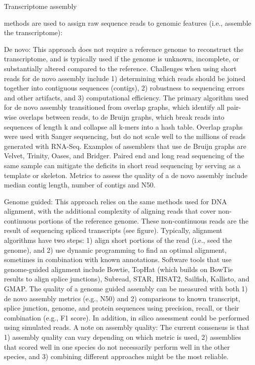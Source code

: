 Transcriptome assembly

methods are used to assign raw sequence reads to genomic features (i.e., assemble the transcriptome):

De novo: This approach does not require a reference genome to reconstruct the transcriptome, and is typically used if the genome is unknown, incomplete, or substantially altered compared to the reference. Challenges when using short reads for de novo assembly include 1) determining which reads should be joined together into contiguous sequences (contigs), 2) robustness to sequencing errors and other artifacts, and 3) computational efficiency. The primary algorithm used for de novo assembly transitioned from overlap graphs, which identify all pair-wise overlaps between reads, to de Bruijn graphs, which break reads into sequences of length k and collapse all k-mers into a hash table. Overlap graphs were used with Sanger sequencing, but do not scale well to the millions of reads generated with RNA-Seq. Examples of assemblers that use de Bruijn graphs are Velvet, Trinity, Oases, and Bridger. Paired end and long read sequencing of the same sample can mitigate the deficits in short read sequencing by serving as a template or skeleton. Metrics to assess the quality of a de novo assembly include median contig length, number of contigs and N50.

Genome guided: This approach relies on the same methods used for DNA alignment, with the additional complexity of aligning reads that cover non-continuous portions of the reference genome. These non-continuous reads are the result of sequencing spliced transcripts (see figure). Typically, alignment algorithms have two steps: 1) align short portions of the read (i.e., seed the genome), and 2) use dynamic programming to find an optimal alignment, sometimes in combination with known annotations. Software tools that use genome-guided alignment include Bowtie, TopHat (which builds on BowTie results to align splice junctions), Subread, STAR, HISAT2, Sailfish, Kallisto, and GMAP. The quality of a genome guided assembly can be measured with both 1) de novo assembly metrics (e.g., N50) and 2) comparisons to known transcript, splice junction, genome, and protein sequences using precision, recall, or their combination (e.g., F1 score). In addition, in silico assessment could be performed using simulated reads.
A note on assembly quality: The current consensus is that 1) assembly quality can vary depending on which metric is used, 2) assemblies that scored well in one species do not necessarily perform well in the other species, and 3) combining different approaches might be the most reliable.

